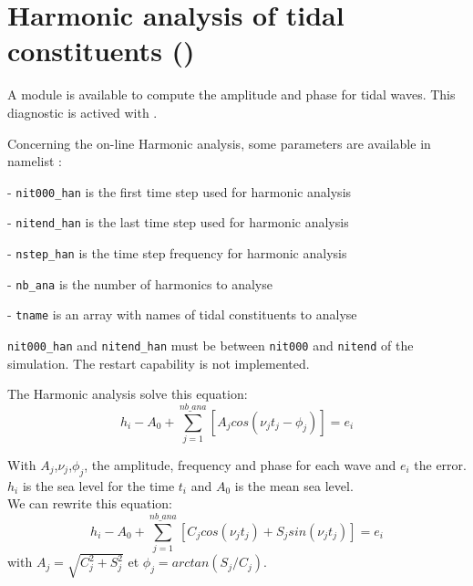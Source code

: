 \section{Harmonic analysis of tidal constituents () }
\label{DIA_diag_harm}

A module is available to compute the amplitude and phase for tidal waves. 
This diagnostic is actived with .


Concerning the on-line Harmonic analysis, some parameters are available in namelist
 :

- \texttt{nit000\_han} is the first time step used for harmonic analysis

- \texttt{nitend\_han} is the last time step used for harmonic analysis

- \texttt{nstep\_han} is the time step frequency for harmonic analysis

- \texttt{nb\_ana} is the number of harmonics to analyse

- \texttt{tname} is an array with names of tidal constituents to analyse

\texttt{nit000\_han} and \texttt{nitend\_han} must be between \texttt{nit000} and \texttt{nitend} of the simulation.
The restart capability is not implemented.

The Harmonic analysis solve this equation:
\begin{equation}
h_{i} - A_{0} + \sum^{nb\_ana}_{j=1}[A_{j}cos(\nu_{j}t_{j}-\phi_{j})] = e_{i}
\end{equation}

With $A_{j}$,$\nu_{j}$,$\phi_{j}$, the amplitude, frequency and phase for each wave and $e_{i}$ the error.
$h_{i}$ is the sea level for the time $t_{i}$ and $A_{0}$ is the mean sea level. \\
We can rewrite this equation:
\begin{equation}
h_{i} - A_{0} + \sum^{nb\_ana}_{j=1}[C_{j}cos(\nu_{j}t_{j})+S_{j}sin(\nu_{j}t_{j})] = e_{i}
\end{equation}
with $A_{j}=\sqrt{C^{2}_{j}+S^{2}_{j}}$ et $\phi_{j}=arctan(S_{j}/C_{j})$.

